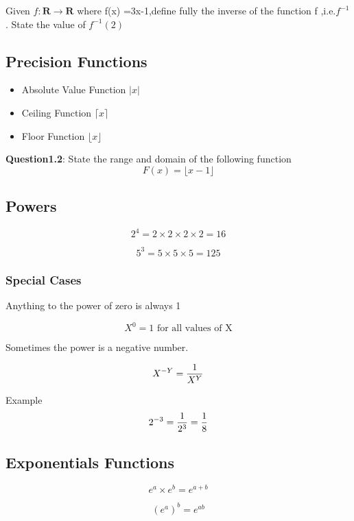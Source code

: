 \documentclass[]{report}
\begin{document}
Given $f : \textbf{R} \rightarrow \textbf{R}$ where f(x) =3x-1,define fully
the inverse of the function f ,i.e.$f^{-1}$. 
State the value of $f^{-1}(2)$
\subsection{Precision Functions}

\begin{itemize}
	\item Absolute Value Function $| x |$
	\item Ceiling Function $\lceil x \rceil$
	\item Floor Function  $\lfloor x \rfloor $
\end{itemize}

\noindent \textbf{Question1.2}: State the range and domain of the following function
\[ F(x) = \lfloor x-1 \rfloor \]
\subsection{Powers}

\[  2^ 4 = 2 \times 2 \times 2 \times 2 = 16 \]

\[  5^ 3 = 5 \times 5 \times 5 =125 \]

\subsubsection{Special Cases}

Anything to the power of zero is always 1

\[  X^ 0 = 1 \mbox{ for all values of X} \]

Sometimes the power is a negative number.

\[  X^{-Y} = { 1 \over X^Y}  \]

Example 
\[  2^{-3} = { 1 \over 2^3} = { 1 \over 8}  \]



\subsection{Exponentials Functions}

\[ e^a \times e^b = e^{a+b}\]

\[ (e^a )^b = e^{ab}\]
\end{document}

